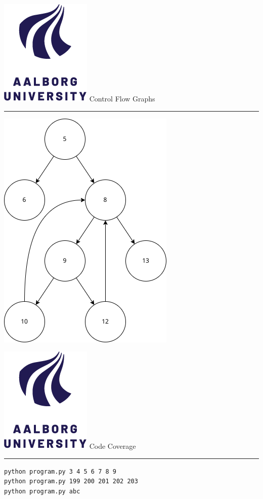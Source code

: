 \documentclass[aspectratio=1610,17pt,utf8]{beamer}
\newcommand{\regularframe}[1]{\color{black}\includegraphics[width=.05\textwidth]{figures/aau.png} #1\\\hrule}
\newcommand{\rf}[1]{\regularframe{#1}}
\begin{document}
\begin{frame}{\rf{Control Flow Graphs}}
    \tiny
    \begin{minipage}{.35\textwidth}
        \includegraphics[width=\textwidth]{figures/control-flow.drawio.png}
    \end{minipage}\hspace{.04\textwidth}
    \begin{minipage}{.60\textwidth}
        
    \end{minipage}
\end{frame}

\begin{frame}{\rf{Code Coverage}}
    
    \tiny \texttt{python program.py \color{green}3 4 5 6 7 8 9}\\
    \tiny \texttt{python program.py \color{green}199 \color{red} 200 201 202 203}\\
    \tiny \texttt{python program.py \color{blue} abc}
\end{frame}
\end{document}
